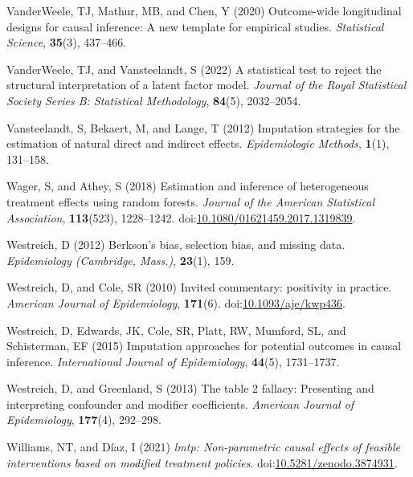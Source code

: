 \documentclass[
  singlecolumn]{article}
\newlength{\cslhangindent}
\newenvironment{CSLReferences}[2] %
 {\begin{list}{}{%
  \setlength{\itemindent}{0pt}
  \setlength{\leftmargin}{0pt}
  \setlength{\parsep}{0pt}
  \ifodd #1
   \setlength{\leftmargin}{\cslhangindent}
   \setlength{\itemindent}{-1\cslhangindent}
  \fi
  \setlength{\itemsep}{#2\baselineskip}}}
 {\end{list}}
\begin{document}
\begin{CSLReferences}{1}{0}
VanderWeele, TJ, Mathur, MB, and Chen, Y (2020) Outcome-wide
longitudinal designs for causal inference: A new template for empirical
studies. \emph{Statistical Science}, \textbf{35}(3), 437--466.

VanderWeele, TJ, and Vansteelandt, S (2022) A statistical test to reject
the structural interpretation of a latent factor model. \emph{Journal of
the Royal Statistical Society Series B: Statistical Methodology},
\textbf{84}(5), 2032--2054.

Vansteelandt, S, Bekaert, M, and Lange, T (2012) Imputation strategies
for the estimation of natural direct and indirect effects.
\emph{Epidemiologic Methods}, \textbf{1}(1), 131--158.

Wager, S, and Athey, S (2018) Estimation and inference of heterogeneous
treatment effects using random forests. \emph{Journal of the American
Statistical Association}, \textbf{113}(523), 1228--1242.
doi:\href{https://doi.org/10.1080/01621459.2017.1319839}{10.1080/01621459.2017.1319839}.

Westreich, D (2012) Berkson's bias, selection bias, and missing data.
\emph{Epidemiology (Cambridge, Mass.)}, \textbf{23}(1), 159.

Westreich, D, and Cole, SR (2010) Invited commentary: positivity in
practice. \emph{American Journal of Epidemiology}, \textbf{171}(6).
doi:\href{https://doi.org/10.1093/aje/kwp436}{10.1093/aje/kwp436}.

Westreich, D, Edwards, JK, Cole, SR, Platt, RW, Mumford, SL, and
Schisterman, EF (2015) Imputation approaches for potential outcomes in
causal inference. \emph{International Journal of Epidemiology},
\textbf{44}(5), 1731--1737.

Westreich, D, and Greenland, S (2013) The table 2 fallacy: Presenting
and interpreting confounder and modifier coefficients. \emph{American
Journal of Epidemiology}, \textbf{177}(4), 292--298.

Williams, NT, and Díaz, I (2021) \emph{{l}mtp: Non-parametric causal
effects of feasible interventions based on modified treatment policies}.
doi:\href{https://doi.org/10.5281/zenodo.3874931}{10.5281/zenodo.3874931}.

\end{CSLReferences}
\end{document}
